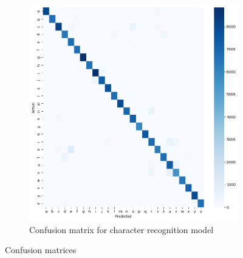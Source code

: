 \begin{figure}[h]
\begin{subfigure}[b]{0.6\textwidth}
		\includegraphics[width=\textwidth]{images/confusion_matrix_characters}
		\caption{Confusion matrix for character recognition model}
		\label{fig:characters_confusion_matrix}
	\end{subfigure}
	\caption{Confusion matrices}
	\label{fig:confusion_matrices}
\end{figure}
